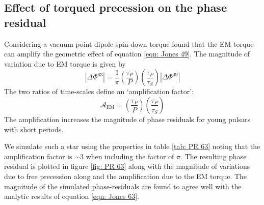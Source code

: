 \documentclass[../full_thesis/full_thesis.tex]{subfiles}
\begin{document}


\subsection{Effect of torqued precession on the phase residual}
\label{sec: phase residual torqued}
Considering a vacuum point-dipole spin-down torque \citet{Jones2001} found that
the EM torque can amplify the geometric effect of equation \eqref{eqn: Jones
49}. The magnitude of variation due to EM torque is given by
\begin{equation}
    |\Delta\Phi^{63}| = \frac{1}{\pi}\left(\frac{\tau_{P}}{P}\right)
    \left(\frac{\tau_{P}}{\tau_{S}}\right)
                                    |\Delta\Phi^{49}|
\label{eqn: Jones 63}
\end{equation}
The two ratios of time-scales define an `amplification factor':
\begin{equation}
    \mathcal{A}_{\mathrm{EM}} = \left(\frac{\tau_{P}}{P}\right)
                                \left(\frac{\tau_{P}}{\tau_{S}}\right)
\label{eqn: EM amplification}
\end{equation}
The amplification increases
the magnitude of phase residuals for young pulsars with short periods.

We simulate such a star using the properties in table \ref{tab: PR 63} noting that
the amplification factor is $\sim 3$ when including the factor of $\pi$. The
resulting phase residual is plotted in figure \ref{fig: PR 63} along with the
magnitude of variations due to free precession along and the amplification due
to the EM torque. The magnitude of the simulated phase-residuals are found to
agree well with the analytic results of equation \eqref{eqn: Jones 63}.

\end{document}
